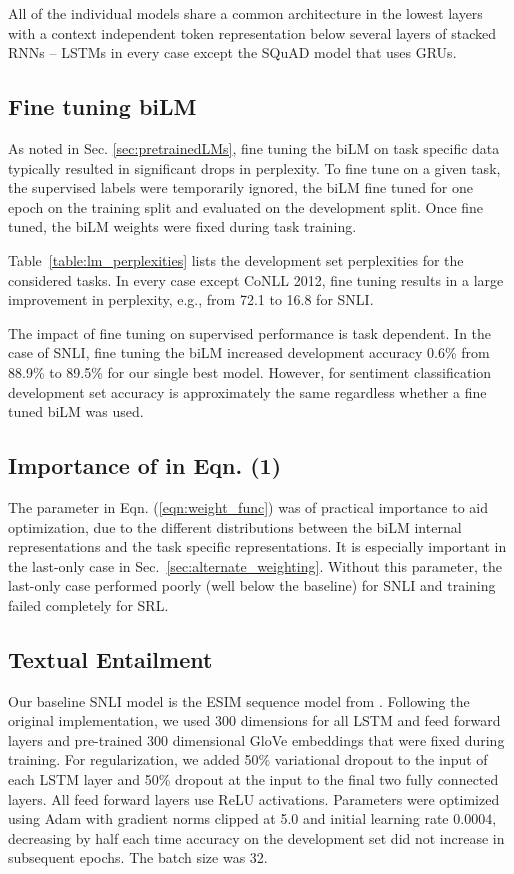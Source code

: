 \documentclass[11pt,a4paper]{article}
\begin{document}
All of the individual models share a common architecture in the lowest layers with a context independent token representation below several layers of stacked RNNs
-- LSTMs in every case except the SQuAD model that uses GRUs.

\subsection{Fine tuning biLM}
As noted in Sec. \ref{sec:pretrainedLMs}, fine tuning the biLM on task specific data typically resulted in significant drops in perplexity.
To fine tune on a given task, the supervised labels were temporarily ignored, the biLM fine tuned for one epoch
on the training split and evaluated on the development split.
Once fine tuned, the biLM weights were fixed during task training.

Table~\ref{table:lm_perplexities} lists the development set perplexities for the considered tasks.   In every case except CoNLL 2012, fine tuning results in a large improvement in perplexity, e.g., from 72.1 to 16.8 for SNLI.

The impact of fine tuning on supervised performance is task dependent.
In the case of SNLI, fine tuning the biLM increased development accuracy 0.6\% from 88.9\% to 89.5\% for our single best model.
However, for sentiment classification development set accuracy is approximately the same regardless whether a fine tuned biLM was used.

\subsection{Importance of  in Eqn. (1)}
The  parameter in Eqn. (\ref{eqn:weight_func}) was of practical importance to aid optimization, due to the different distributions between the biLM internal representations and the task specific representations.
It is especially important in the last-only case in Sec.~\ref{sec:alternate_weighting}.  
Without this parameter, the last-only case performed poorly (well below the baseline) for SNLI and training failed completely for SRL.


\subsection{Textual Entailment}
Our baseline SNLI model is the ESIM sequence model from \citet{Chen2017EnhancedLF}.
Following the original implementation, we used 300 dimensions for all LSTM and feed forward layers and pre-trained 300 dimensional GloVe embeddings that were fixed during training.
For regularization, we added 50\% variational dropout \citep{Gal2016ATG} to the input of each LSTM layer and 50\% dropout \citep{Srivastava2014DropoutAS} at the input to the final two fully connected layers.  All feed forward layers use ReLU activations.
Parameters were optimized using Adam \citep{Kingma2014AdamAM} with gradient norms clipped at 5.0 and initial learning rate 0.0004, decreasing by half each time accuracy on the development set did not increase in subsequent epochs.  The batch size was 32.
\end{document}
